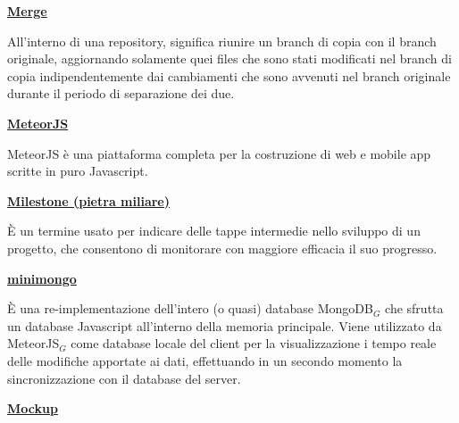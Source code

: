 \bigskip
\begin{addmargin}[0em]{0em}	
	\textbf{\underline{Merge}} 
\end{addmargin}

\medskip
\begin{addmargin}[5em]{1em}	
All'interno di una repository, significa riunire un branch di copia con il branch originale, aggiornando solamente quei files che sono stati modificati nel branch di copia indipendentemente
dai cambiamenti che sono avvenuti nel branch originale durante il periodo di separazione dei due.
\end{addmargin}

\bigskip
\begin{addmargin}[0em]{0em}	
	\textbf{\underline{MeteorJS}} 
\end{addmargin}

\medskip
\begin{addmargin}[5em]{1em}	
MeteorJS è una piattaforma completa per la costruzione di web e mobile app scritte in puro Javascript.
\end{addmargin}

\bigskip
\begin{addmargin}[0em]{0em}	
	\textbf{\underline{Milestone (pietra miliare)}} 
\end{addmargin}
	
\medskip
\begin{addmargin}[5em]{1em}	
È un termine usato per indicare delle tappe intermedie nello sviluppo di un progetto, che consentono di monitorare con maggiore efficacia il suo progresso.
\end{addmargin}	

\bigskip
\begin{addmargin}[0em]{0em}	
	\textbf{\underline{minimongo}} 
\end{addmargin}
	
\medskip
\begin{addmargin}[5em]{1em}	
È una re-implementazione dell'intero (o quasi) database MongoDB$_G$ che sfrutta un database Javascript all'interno della memoria principale. Viene utilizzato da MeteorJS$_G$ come database locale del client per la visualizzazione i tempo reale delle modifiche apportate ai dati, effettuando in un secondo momento la sincronizzazione con il database del server.
\end{addmargin}	


\bigskip
\begin{addmargin}[0em]{0em}	
	\textbf{\underline{Mockup}} 
\end{addmargin}
	
